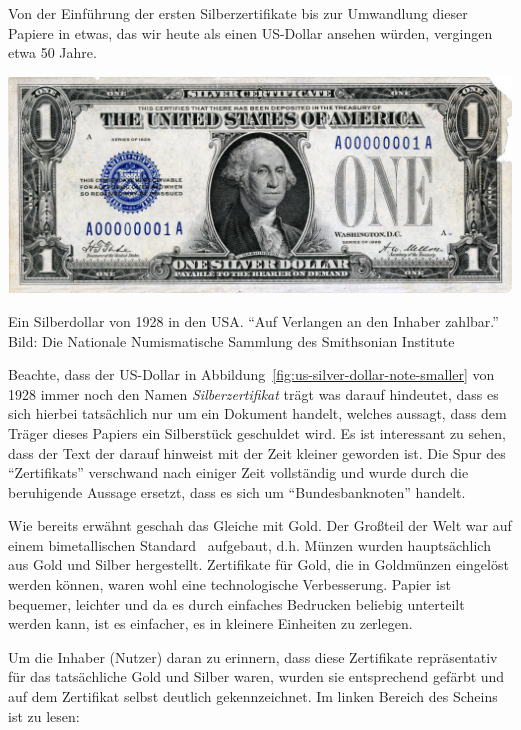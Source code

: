 Von der Einführung der ersten Silberzertifikate bis zur Umwandlung dieser
Papiere in etwas, das wir heute als einen US-Dollar ansehen würden, vergingen
etwa 50 Jahre.

\begin{center}
  \centering
  \includegraphics[width=\textwidth]{assets/images/us-silver-dollar-note-smaller.png}
  \caption{Ein Silberdollar von 1928 in den USA. \enquote{Auf Verlangen an den
  Inhaber zahlbar.} Bild: Die Nationale Numismatische Sammlung des Smithsonian
  Institute}
  \label{fig:us-silver-dollar-note-smaller}
\end{center}

Beachte, dass der US-Dollar in Abbildung~\ref{fig:us-silver-dollar-note-smaller}
von 1928 immer noch den Namen \textit{Silberzertifikat} trägt was darauf
hindeutet, dass es sich hierbei tatsächlich nur um ein Dokument handelt, welches
aussagt, dass dem Träger dieses Papiers ein Silberstück geschuldet wird. Es ist
interessant zu sehen, dass der Text der darauf hinweist mit der Zeit kleiner
geworden ist. Die Spur des \enquote{Zertifikats} verschwand nach einiger Zeit
vollständig und wurde durch die beruhigende Aussage ersetzt, dass es sich um
\enquote{Bundesbanknoten} handelt.

Wie bereits erwähnt geschah das Gleiche mit Gold. Der Großteil der Welt war auf
einem bimetallischen Standard~\cite{wiki:bimetallism} aufgebaut, d.h. Münzen
wurden hauptsächlich aus Gold und Silber hergestellt. Zertifikate für Gold, die
in Goldmünzen eingelöst werden können, waren wohl eine technologische
Verbesserung. Papier ist bequemer, leichter und da es durch einfaches Bedrucken
beliebig unterteilt werden kann, ist es einfacher, es in kleinere Einheiten zu
zerlegen.

Um die Inhaber (Nutzer) daran zu erinnern, dass diese Zertifikate repräsentativ
für das tatsächliche Gold und Silber waren, wurden sie entsprechend gefärbt und
auf dem Zertifikat selbst deutlich gekennzeichnet. Im linken Bereich des Scheins
ist zu lesen:


